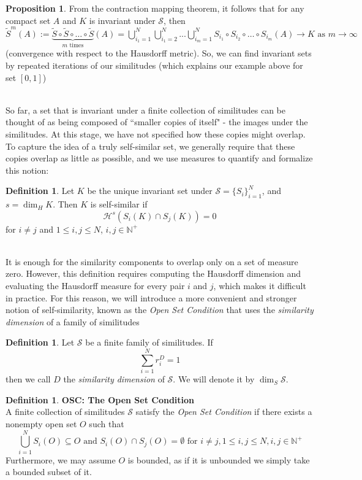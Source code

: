 \documentclass{article}
\theoremstyle{plain}
\theoremstyle{definition}
\newtheorem{defn}[thm]{Definition}
\newtheorem{prop}[thm]{Proposition}
\theoremstyle{remark}
\begin{document}
\begin{prop}\label{prop:contract}
    From the contraction mapping theorem, it follows that for any compact set $A$ and $K$ is invariant under $\mathcal{S}$, then $\tilde{S}^m(A) := \underbrace{\tilde{S} \circ \tilde{S} \circ \dots \circ \tilde{S}}_{m \text{ times}}(A) = \bigcup \limits _{i_1=1}^N \bigcup \limits _{i_1=2}^N ... \bigcup \limits _{i_m=1}^N S_{i_1}\circ S_{i_2} \circ \dots \circ S_{i_m}(A) \to K  \text{ as } m\to \infty $ (convergence with respect to the Hausdorff metric). So, we can find invariant sets by repeated iterations of our similitudes (which explains our example above for set $[0,1]$)
\end{prop}
~\\So far, a set that is invariant under a finite collection of similitudes can be thought of as being composed of ``smaller copies of itself" - the images under the similitudes. At this stage, we have not specified how these copies might overlap. To capture the idea of a truly self-similar set, we generally require that these copies overlap as little as possible, and we use measures to quantify and formalize this notion:

\begin{defn}
    Let $K$ be the unique invariant set under $\mathcal{S} = \{S_i\}_{i=1}^N$, and $s = \dim _H K$. Then $K$ is self-similar if \[\mathcal{H}^s(S_i(K) \cap S_j(K)) = 0\] for $ i \ne j$ and $1\le i,j \le N$, $i,j \in \mathbb{N^+}$
\end{defn}
~\\
It is enough for the similarity components to overlap only on a set of measure zero. However, this definition requires computing the Hausdorff dimension and evaluating the Hausdorff measure for every pair $i$ and $j$, which makes it difficult in practice. For this reason, we will introduce a more convenient and stronger notion of self-similarity, known as the \textit{Open Set Condition} that uses the \textit{similarity dimension} of a family of similitudes

\begin{defn}
    Let $\mathcal{S}$ be a finite family of similitudes. If \[
    \sum \limits_{i=1}^N r_i^D = 1
    \]then we call $D$ the \textit{similarity dimension} of $\mathcal{S}$. We will denote it by $\dim _S\mathcal{S} $.
\end{defn}

\newpage

\begin{defn}{\textbf{OSC: The Open Set Condition}} ~\\
    A finite collection of similitudes $\mathcal{S}$ satisfy the \textit{Open Set Condition} if there exists a nonempty open set $O$ such that \[\bigcup \limits _{i=1}^N S_i(O) \subseteq O \text{ and } S_i(O) \cap S_j(O) = \emptyset \text{ for } i \ne j, 1\le i,j\le N, i,j \in \mathbb{N}^+\]Furthermore, we may assume $O$ is bounded, as if it is unbounded we simply take a bounded subset of it.
\end{defn}
\end{document}
